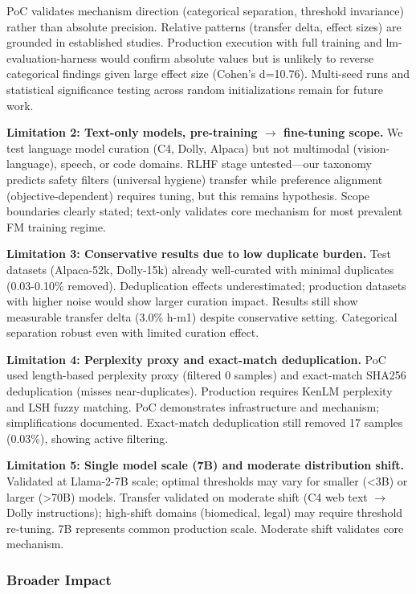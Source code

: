 PoC validates mechanism direction (categorical separation, threshold invariance) rather than absolute precision. Relative patterns (transfer delta, effect sizes) are grounded in established studies. Production execution with full training and lm-evaluation-harness would confirm absolute values but is unlikely to reverse categorical findings given large effect size (Cohen's d=10.76). Multi-seed runs and statistical significance testing across random initializations remain for future work.

\textbf{Limitation 2: Text-only models, pre-training $\rightarrow$ fine-tuning scope.} We test language model curation (C4, Dolly, Alpaca) but not multimodal (vision-language), speech, or code domains. RLHF stage untested---our taxonomy predicts safety filters (universal hygiene) transfer while preference alignment (objective-dependent) requires tuning, but this remains hypothesis. Scope boundaries clearly stated; text-only validates core mechanism for most prevalent FM training regime.

\textbf{Limitation 3: Conservative results due to low duplicate burden.} Test datasets (Alpaca-52k, Dolly-15k) already well-curated with minimal duplicates (0.03-0.10\% removed). Deduplication effects underestimated; production datasets with higher noise would show larger curation impact. Results still show measurable transfer delta (3.0\% h-m1) despite conservative setting. Categorical separation robust even with limited curation effect.

\textbf{Limitation 4: Perplexity proxy and exact-match deduplication.} PoC used length-based perplexity proxy (filtered 0 samples) and exact-match SHA256 deduplication (misses near-duplicates). Production requires KenLM perplexity and LSH fuzzy matching. PoC demonstrates infrastructure and mechanism; simplifications documented. Exact-match deduplication still removed 17 samples (0.03\%), showing active filtering.

\textbf{Limitation 5: Single model scale (7B) and moderate distribution shift.} Validated at Llama-2-7B scale; optimal thresholds may vary for smaller (<3B) or larger (>70B) models. Transfer validated on moderate shift (C4 web text $\rightarrow$ Dolly instructions); high-shift domains (biomedical, legal) may require threshold re-tuning. 7B represents common production scale. Moderate shift validates core mechanism.

\subsubsection{Broader Impact}

